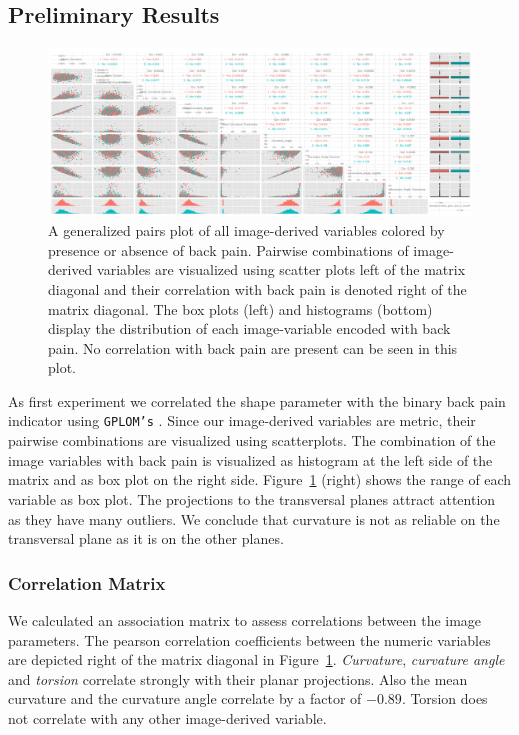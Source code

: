\documentclass[a4paper,twoside]{style/article}
\begin{document}
\subsection{Preliminary Results}
\begin{figure}[htb]
  \centering
  \includegraphics[width=1.0\textwidth]{figures/image-parameter-range}
  \caption{%
A generalized pairs plot of all image-derived variables colored by presence or absence of back pain.
Pairwise combinations of image-derived variables are visualized using scatter plots left of the matrix diagonal and their correlation with back pain is denoted right of the matrix diagonal.
The box plots (left) and histograms (bottom) display the distribution of each image-variable encoded with back pain.
No correlation with back pain are present can be seen in this plot.
}
  \label{fig:image-parameter-range}
\end{figure}
\noindent As first experiment we correlated the shape parameter with the binary back pain indicator using \texttt{GPLOM's} \cite{GPLOMS}.
Since our image-derived variables are metric, their pairwise combinations are visualized using scatterplots.
The combination of the image variables with back pain is visualized as histogram at the left side of the matrix and as box plot on the right side.
Figure~\ref{fig:image-parameter-range} (right) shows the range of each variable as box plot.
The projections to the transversal planes attract attention as they have many outliers.
We conclude that curvature is not as reliable on the transversal plane as it is on the other planes.
\subsubsection{Correlation Matrix}
We calculated an association matrix to assess correlations between the image parameters.
The pearson correlation coefficients between the numeric variables are depicted right of the matrix diagonal in Figure~\ref{fig:image-parameter-range}.
\emph{Curvature}, \emph{curvature angle} and \emph{torsion} correlate strongly with their planar projections.
Also the mean curvature and the curvature angle correlate by a factor of $-0.89$.
Torsion does not correlate with any other image-derived variable.
\end{document}
